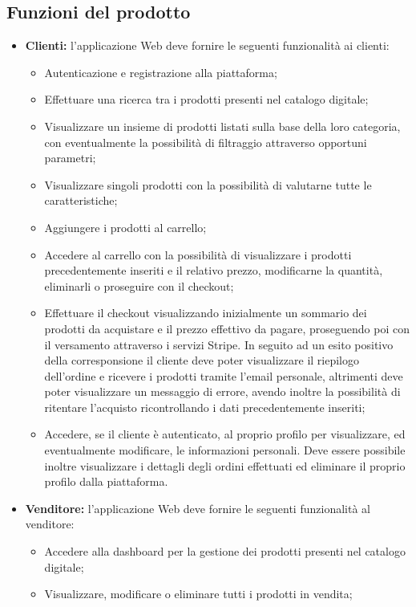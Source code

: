 \subsection{Funzioni del prodotto}
\begin{itemize}
\item \textbf{Clienti:} l'applicazione Web deve fornire le seguenti funzionalità ai clienti:
	\begin{itemize}
	\item Autenticazione e registrazione alla piattaforma;
	\item Effettuare una ricerca tra i prodotti presenti nel catalogo digitale;
	\item Visualizzare un insieme di prodotti listati sulla base della loro categoria, con eventualmente la possibilità di filtraggio attraverso opportuni parametri;
	\item Visualizzare singoli prodotti con la possibilità di valutarne tutte le caratteristiche;
	\item Aggiungere i prodotti al carrello;
	\item Accedere al carrello con la possibilità di visualizzare i prodotti precedentemente inseriti e il relativo prezzo, modificarne la quantità, eliminarli o proseguire con il checkout;
	\item Effettuare il checkout visualizzando inizialmente un sommario dei prodotti da acquistare e il prezzo effettivo da pagare, proseguendo poi con il versamento attraverso i servizi Stripe. In seguito ad un esito positivo della corresponsione il cliente deve poter visualizzare il riepilogo dell'ordine e ricevere i prodotti tramite l'email personale, altrimenti deve poter visualizzare un messaggio di errore, avendo inoltre la possibilità di ritentare l'acquisto ricontrollando i dati precedentemente inseriti;
	\item Accedere, se il cliente è autenticato, al proprio profilo per visualizzare, ed eventualmente modificare, le informazioni personali. Deve essere possibile inoltre visualizzare i dettagli degli ordini effettuati ed eliminare il proprio profilo dalla piattaforma.
	\end{itemize}
\item \textbf{Venditore:} l'applicazione Web deve fornire le seguenti funzionalità al venditore:
	\begin{itemize}
	\item Accedere alla dashboard per la gestione dei prodotti presenti nel catalogo digitale;
	\item Visualizzare, modificare o eliminare tutti i prodotti in vendita;

\end{itemize}
\end{itemize}
